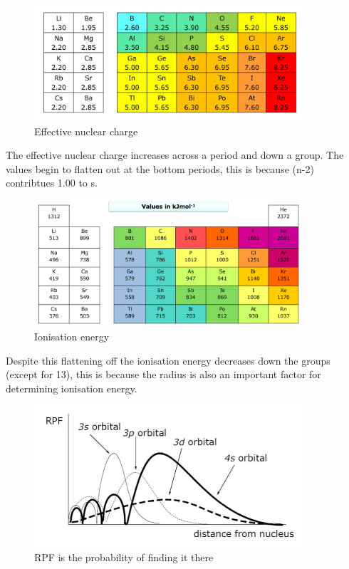 \documentclass{article}
\begin{document}
    \begin{figure}[h]
        \centering
        \includegraphics[width=10cm]{eff.jpg}
        \caption{Effective nuclear charge}
    \end{figure}

    The effective nuclear charge increases across a period and down a group. The values begin to flatten out at
    the bottom periods, this is because (n-2) contribtues 1.00 to s. 
    \newpage
    \begin{figure}[h]
        \centering
        \includegraphics[width=10cm]{ionisation energy.jpg}
        \caption{Ionisation energy}
    \end{figure}

    Despite this flattening off the ionisation energy decreases down the groups (except for 13), this is because
    the radius is also an important factor for determining ionisation energy.

    \begin{figure}[h]
        \centering
        \includegraphics[width=10cm]{pen.jpg}
        \caption{RPF is the probability of finding it there}
    \end{figure}
\end{document}
